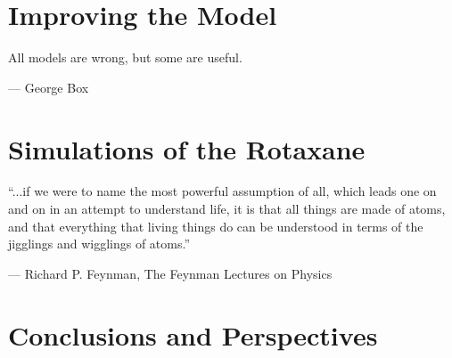 \documentclass[11pt,a4paper,twoside]{vutinfth}
\newcommand*\cleartoleftpage{%
  \clearpage
  \ifodd\value{page}\hbox{}\newpage\fi
}
\newenvironment{smallfont}{\fontfamily{lmodern}\small\selectfont}{\par}
\begin{document}
\chapter{Improving the Model}
\epigraph{All models are wrong, but some are useful.}
{--- \textup{George Box}}





\chapter{Simulations of the Rotaxane}
\vspace{0.5cm}
\epigraphfontsize{\small\itshape}
\epigraph{“...if we were to name the most powerful assumption of all, which leads one on
and on in an attempt to understand life, it is that all things are made of atoms, and
that everything that living things do can be understood in terms of the jigglings and
wigglings of atoms.”}
{--- \textup{Richard P. Feynman}, The Feynman Lectures on Physics\cite{feynmanLectures}}




\chapter{Conclusions and Perspectives}




\begin{appendices}

\end{appendices}

\twocolumn
% 
\printbibliography

\onecolumn

\cleardoublepage
\thispagestyle{empty}

\cleartoleftpage{} %

\end{document}
